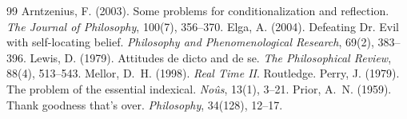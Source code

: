 \documentclass{situationist-preprint}
\begin{document}
\begin{thebibliography}{99}\small
{} Arntzenius, F. (2003). Some problems for conditionalization and reflection. \emph{The Journal of Philosophy}, 100(7), 356--370.
 Elga, A. (2004). Defeating Dr. Evil with self-locating belief. \emph{Philosophy and Phenomenological Research}, 69(2), 383--396.
 Lewis, D. (1979). Attitudes de dicto and de se. \emph{The Philosophical Review}, 88(4), 513--543.
 Mellor, D.~H. (1998). \emph{Real Time II}. Routledge.
 Perry, J. (1979). The problem of the essential indexical. \emph{No\^us}, 13(1), 3--21.
 Prior, A.~N. (1959). Thank goodness that's over. \emph{Philosophy}, 34(128), 12--17.
\end{thebibliography}
\end{document}
